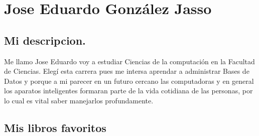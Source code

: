 \chapter{Jose Eduardo González Jasso}
\section{Mi descripcion.}
Me llamo Jose Eduardo voy a estudiar Ciencias de la computación en la Facultad de Ciencias. Elegí esta carrera pues me intersa aprendar a administrar Bases de Datos y porque a mi parecer en un futuro cercano las computadoras y en general los aparatos inteligentes formaran parte de la vida cotidiana de las personas, por lo cual es vital saber manejarlos profundamente.

\section{Mis libros favoritos}
